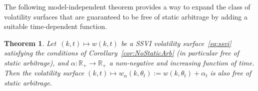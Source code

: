\documentclass[12pt]{article}
\newtheorem{remark}{Remark}[section]
\newtheorem{theorem}{Theorem}[section]
\numberwithin{equation}{section}
\begin{document}
The following model-independent theorem provides a way to expand the class of volatility surfaces that are guaranteed to be free of static arbitrage by adding a suitable time-dependent function.


\begin{theorem}\label{thm:AddingAlpha}
Let~$(k,t)\mapsto w(k,t)$ be a SSVI volatility surface~\eqref{eq:ssvi} satisfying the conditions of Corollary~\ref{cor:NoStaticArb}
(in particular free of static arbitrage), 
and $\alpha:\mathbb{R}_+\to\mathbb{R}_+$ a non-negative and increasing function of time.
Then the volatility surface $(k,t)\mapsto w_\alpha(k,\theta_t):=w(k,\theta_t )+\alpha_t$ is also free of static arbitrage.
\end{theorem}

\end{document}
